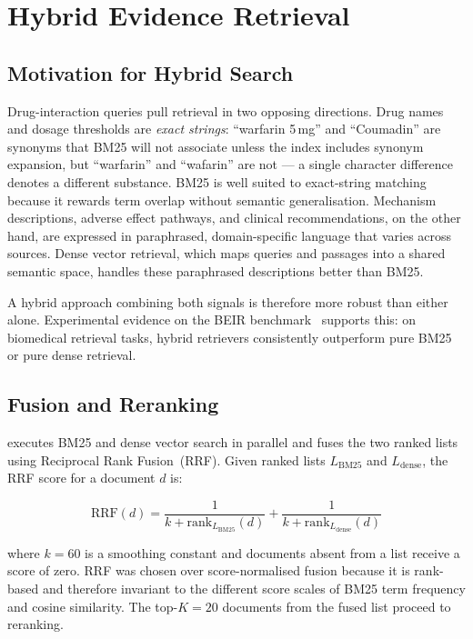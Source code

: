 \section{Hybrid Evidence Retrieval}
\label{sec:hybrid_retrieval}

\subsection{Motivation for Hybrid Search}

Drug-interaction queries pull retrieval in two opposing directions.
Drug names and dosage thresholds are \emph{exact strings}: ``warfarin 5\,mg'' and
``Coumadin'' are synonyms that BM25 will not associate unless the index includes
synonym expansion, but ``warfarin'' and ``wafarin'' are not --- a single character
difference denotes a different substance.
BM25 is well suited to exact-string matching because it rewards term overlap
without semantic generalisation.
Mechanism descriptions, adverse effect pathways, and clinical recommendations, on
the other hand, are expressed in paraphrased, domain-specific language that varies
across sources.
Dense vector retrieval, which maps queries and passages into a shared semantic space,
handles these paraphrased descriptions better than BM25.

A hybrid approach combining both signals is therefore more robust than either alone.
Experimental evidence on the BEIR benchmark~\cite{thakur2021beir} supports
this: on biomedical retrieval tasks, hybrid retrievers consistently outperform
pure BM25 or pure dense retrieval.

\subsection{Fusion and Reranking}

\rarerag{} executes BM25 and dense vector search in parallel and fuses the
two ranked lists using Reciprocal Rank Fusion~(RRF).
Given ranked lists $L_\text{BM25}$ and $L_\text{dense}$, the RRF score for
a document $d$ is:

\begin{equation}
  \text{RRF}(d)
    = \frac{1}{k + \mathrm{rank}_{L_\text{BM25}}(d)}
    + \frac{1}{k + \mathrm{rank}_{L_\text{dense}}(d)}
  \label{eq:rrf_ch3}
\end{equation}

where $k = 60$ is a smoothing constant and documents absent from a list
receive a score of zero.
RRF was chosen over score-normalised fusion because it is rank-based and
therefore invariant to the different score scales of BM25 term frequency and
cosine similarity.
The top-$K = 20$ documents from the fused list proceed to reranking.

